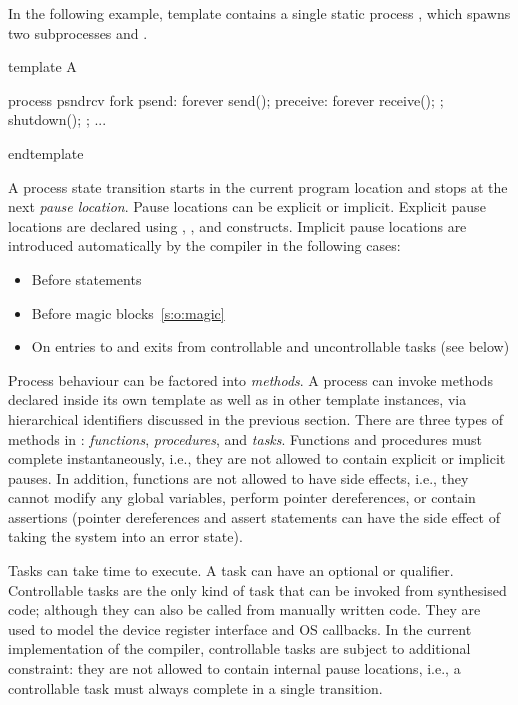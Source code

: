 In the following example, template  contains a single 
static process , which spawns two subprocesses 
 and .
\begin{tsllisting2}
template A

process psndrcv {
  fork {
    psend:    forever send();
    preceive: forever receive();
  };
  shutdown();
};
...

endtemplate
\end{tsllisting2}


A process state transition starts in the current program location 
and stops at the next \emph{pause location}.  Pause locations can 
be explicit or implicit.  Explicit pause locations are declared 
using , , and  constructs.  
Implicit pause locations are introduced automatically by the 
compiler in the following cases:

\begin{itemize}
    \item Before  statements
    \item Before magic blocks~\ref{s:o:magic}
    \item On entries to and exits from controllable and 
        uncontrollable tasks (see below)
\end{itemize}

Process behaviour can be factored into \emph{methods}.  A process 
can invoke methods declared inside its own template as well as in 
other template instances, via hierarchical identifiers discussed 
in the previous section.  There are three types of methods in 
\tsl: \emph{functions}, \emph{procedures}, and \emph{tasks}.  
Functions and procedures must complete instantaneously, i.e., they 
are not allowed to contain explicit or implicit pauses.  In 
addition, functions are not allowed to have side effects, i.e., 
they cannot modify any global variables, perform pointer 
dereferences, or contain assertions (pointer dereferences and 
assert statements can have the side effect of taking the system 
into an error state).  

Tasks can take time to execute.  A task can have an optional 
 or  qualifier.  
Controllable tasks are the only kind of task that can be invoked 
from synthesised code; although they can also be called from 
manually written code.  They are used to model the device register 
interface and OS callbacks.  In the current implementation of the 
\tsl compiler, controllable tasks are subject to additional 
constraint: they are not allowed to contain internal pause 
locations, i.e., a controllable task must always complete in a 
single transition. 

